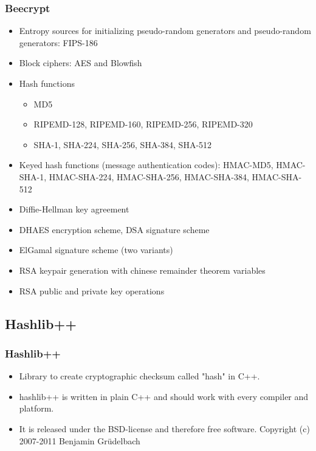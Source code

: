 \documentclass{beamer}
\begin{document}
\begin{frame}
\frametitle{Beecrypt}
\begin{itemize}
\item Entropy sources for initializing pseudo-random generators and pseudo-random generators: FIPS-186
\item Block ciphers: AES and Blowfish
\item Hash functions
\begin{itemize}
\item MD5
\item RIPEMD-128, RIPEMD-160, RIPEMD-256, RIPEMD-320
\item SHA-1, SHA-224, SHA-256, SHA-384, SHA-512
\end{itemize}
\item Keyed hash functions (message authentication codes): HMAC-MD5, HMAC-SHA-1, HMAC-SHA-224, HMAC-SHA-256, HMAC-SHA-384, HMAC-SHA-512
\item Diffie-Hellman key agreement
\item DHAES encryption scheme, DSA signature scheme
\item ElGamal signature scheme (two variants)
\item RSA keypair generation with chinese remainder theorem variables
\item RSA public and private key operations
\end{itemize}
\end{frame}
\subsection{Hashlib++}
\begin{frame}
\frametitle{Hashlib++}
\begin{itemize}
\item Library to create cryptographic checksum called "hash" in C++. 
\item hashlib++ is written in plain C++ and should work with every compiler and platform. 
\item It is released under the BSD-license and therefore free software. Copyright (c) 2007-2011 Benjamin Grüdelbach
\end{itemize} 
\end{frame}
\end{document}
